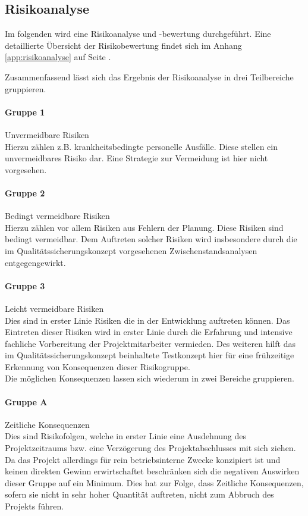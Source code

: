 \documentclass[12pt, xcolor=dvipsnames]{scrartcl}
\begin{document}
\subsection{Risikoanalyse}

Im folgenden wird eine Risikoanalyse und -bewertung durchgeführt.
Eine detaillierte Übersicht der Risikobewertung findet sich im Anhang \ref{app:risikoanalyse} auf Seite \pageref{app:risikoanalyse}.

Zusammenfassend lässt sich das Ergebnis der Risikoanalyse in drei Teilbereiche gruppieren.

\paragraph{Gruppe 1}
Unvermeidbare Risiken \\
Hierzu zählen z.B. krankheitsbedingte personelle Ausfälle. Diese stellen ein unvermeidbares Risiko dar. Eine Strategie zur Vermeidung ist hier nicht vorgesehen.\\

\paragraph{Gruppe 2}
Bedingt vermeidbare Risiken \\
Hierzu zählen vor allem Risiken aus Fehlern der Planung. Diese Risiken sind bedingt vermeidbar. Dem Auftreten solcher Risiken wird insbesondere durch die im  Qualitätssicherungskonzept vorgesehenen Zwischenstandsanalysen entgegengewirkt.

\paragraph{Gruppe 3}
Leicht vermeidbare Risiken \\
Dies sind in erster Linie Risiken die in der Entwicklung auftreten können. Das Eintreten dieser Risiken wird in erster Linie durch die Erfahrung und intensive fachliche Vorbereitung der Projektmitarbeiter vermieden. Des weiteren hilft das im Qualitätssicherungskonzept beinhaltete Testkonzept hier für eine frühzeitige Erkennung von Konsequenzen dieser Risikogruppe. \\

Die möglichen Konsequenzen lassen sich wiederum in zwei Bereiche gruppieren.

\paragraph{Gruppe A} Zeitliche Konsequenzen \\
Dies sind Risikofolgen, welche in erster Linie eine Ausdehnung des Projektzeitraums bzw. eine Verzögerung des Projektabschlusses mit sich ziehen. Da das Projekt allerdings für rein betriebsinterne Zwecke konzipiert ist und keinen direkten Gewinn erwirtschaftet beschränken sich die negativen Auswirken dieser Gruppe auf ein Minimum. Dies hat zur Folge, dass Zeitliche Konsequenzen, sofern sie nicht in sehr hoher Quantität auftreten, nicht zum Abbruch des Projekts führen.
\end{document}
